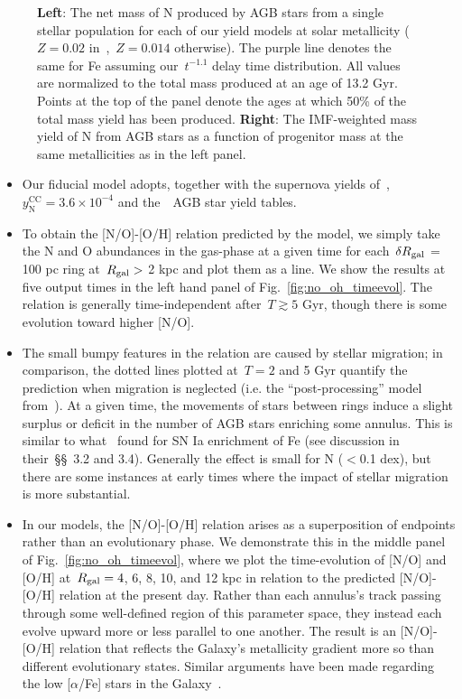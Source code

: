\documentclass[ms.tex]{subfiles}
\begin{document}
\begin{figure}
\caption{ 
\textbf{Left}: The net mass of N produced by AGB stars from a single stellar 
population for each of our yield models at solar metallicity 
($Z = 0.02$ in~\karakasten,~$Z = 0.014$ otherwise). 
The purple line denotes the same for Fe assuming our~$t^{-1.1}$ delay time 
distribution. 
All values are normalized to the total mass produced at an age of 13.2 Gyr. 
Points at the top of the panel denote the ages at which 50\% of the total mass 
yield has been produced. 
\textbf{Right}: The IMF-weighted mass yield of N from AGB stars as a function 
of progenitor mass at the same metallicities as in the left panel. 
} 
\label{fig:ssp} 
\end{figure} 

\begin{itemize} 
	\item Our fiducial model adopts, together with the supernova yields 
	of~\citet[][see discussion in~\S~\ref{sec:methods}]{Johnson2021}, 
	$y_\text{N}^\text{CC} = 3.6\times10^{-4}$ and the~\cristallo~AGB star yield 
	tables. 

	\item To obtain the [N/O]-[O/H] relation predicted by the model, we simply 
	take the N and O abundances in the gas-phase at a given time for 
	each~$\delta R_\text{gal}$ = 100 pc ring at~$R_\text{gal} >$ 2 kpc and plot them as a 
	line.
	We show the results at five output times in the left hand panel of 
	Fig.~\ref{fig:no_oh_timeevol}. 
	The relation is generally time-independent after~$T \gtrsim 5$ Gyr, though 
	there is some evolution toward higher [N/O]. 

	\item The small bumpy features in the relation are caused by stellar 
	migration; in comparison, the dotted lines plotted at~$T = 2$ and 5 Gyr 
	quantify the prediction when migration is neglected (i.e. the 
	``post-processing'' model from~\citealt{Johnson2021}). 
	At a given time, the movements of stars between rings induce a slight 
	surplus or deficit in the number of AGB stars enriching some annulus. 
	This is similar to what~\citet{Johnson2021} found for SN Ia enrichment of 
	Fe (see discussion in their~\S\S~3.2 and 3.4). 
	Generally the effect is small for N ($<$0.1 dex), but there are some 
	instances at early times where the impact of stellar migration is more 
	substantial. \tabularnewline
	
	\item In our models, the [N/O]-[O/H] relation arises as a superposition of 
	endpoints rather than an evolutionary phase. 
	We demonstrate this in the middle panel of 
	Fig.~\ref{fig:no_oh_timeevol}, where we plot the time-evolution of 
	[N/O] and [O/H] at~$R_\text{gal} = 4$, 6, 8, 10, and 12 kpc in relation to the 
	predicted [N/O]-[O/H] relation at the present day. 
	Rather than each annulus's track passing through some well-defined region 
	of this parameter space, they instead each evolve upward more or less 
	parallel to one another. 
	The result is an [N/O]-[O/H] relation that reflects the Galaxy's 
	metallicity gradient more so than different evolutionary states. 
	Similar arguments have been made regarding the low [$\alpha$/Fe] stars in 
	the Galaxy~\citep[see, e.g.,][]{Schoenrich2009, Sharma2020}. 
\end{itemize} 
\end{document}

